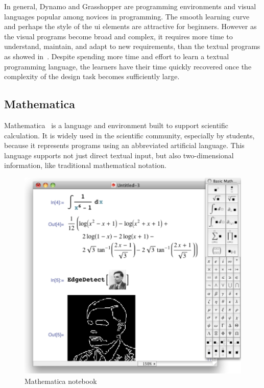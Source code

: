 In general, Dynamo and Grasshopper are programming environments and visual languages popular among novices in programming. The smooth learning curve and perhaps the style of the \gls{ui} elements are attractive for beginners. However as the visual programs become broad and complex, it requires more time to understand, maintain, and adapt to new requirements, than the textual programs as showed in~\citep{leitao2011programming}. Despite spending more time and effort to learn a textual programming language, the learners have their time quickly recovered once the complexity of the design task becomes sufficiently large.
\subsection{Mathematica}
\label{subsec:mathematica}
Mathematica~\citep{wolfram1991mathematica} is a language and environment built to support scientific calculation. It is widely used in the scientific community, especially by students, because it represents programs using an abbreviated artificial language. This language supports not just direct textual input, but also two-dimensional information, like traditional mathematical notation.

\begin{figure}[!htbp]
  \centering
  \includegraphics[width=.7\textwidth]{images/mathematica}
    \caption{Mathematica notebook}  
  \label{fig:math}
\end{figure} 

